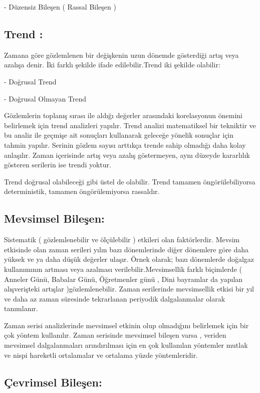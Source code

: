 \documentclass[11pt]{article}
\begin{document}
- Düzensiz Bileşen ( Rassal Bileşen )

\subsection{Trend :}\label{trend}

Zamana göre gözlemlenen bir değişkenin uzun dönemde gösterdiği artış
veya azalışa denir. İki farklı şekilde ifade edilebilir.Trend iki
şekilde olabilir: 

- Doğrusal Trend 

- Doğrusal Olmayan Trend

Gözlemlerin toplanış sırası ile aldığı değerler arasındaki korelasyonun
önemini belirlemek için trend analizleri yapılır. Trend analizi
matematiksel bir tekniktir ve bu analiz ile geçmişe ait sonuçları
kullanarak geleceğe yönelik sonuçlar için tahmin yapılır. Serinin gözlem
sayısı arttıkça trende sahip olmadığı daha kolay anlaşılır. Zaman
içerisinde artış veya azalış göstermeyen, aynı düzeyde kararlılık
gösteren serilerin ise trendi yoktur.

Trend doğrusal olabileceği gibi üstel de olabilir. Trend tamamen
öngörülebiliyorsa deterministik, tamamen öngörülemiyorsa rassaldır.

\subsection{Mevsimsel Bileşen:}\label{mevsimsel-bileux15fen}

Sistematik ( gözlemlenebilir ve ölçülebilir ) etkileri olan
faktörlerdir. Mevsim etkisinde olan zaman serileri yılın bazı
dönemlerinde diğer dönemlere göre daha yüksek ve ya daha düşük değerler
ulaşır. Örnek olarak; bazı dönemlerde doğalgaz kullanımının artması veya
azalması verilebilir.Mevsimsellik farklı biçimlerde ( Anneler Günü,
Babalar Günü, Öğretmenler günü , Dini bayramlar da yapılan alışverişteki
artışlar )gözlemlenebilir. Zaman serilerinde mevsimsellik etkisi bir yıl
ve daha az zaman süresinde tekrarlanan periyodik dalgalanmalar olarak
tanımlanır.

Zaman serisi analizlerinde mevsimsel etkinin olup olmadığını belirlemek
için bir çok yöntem kullanılır. Zaman serisinde mevsimsel bileşen varsa
, veriden mevsimsel dalgalanmaları arındırılması için en çok kullanılan
yöntemler mutlak ve nispi hareketli ortalamalar ve ortalama yüzde
yöntemleridir.

\subsection{Çevrimsel Bileşen:}\label{uxe7evrimsel-bileux15fen}
\end{document}
